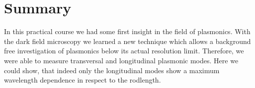 

\chapter{Summary}
\label{chap:sumamry}
In this practical course we had some first insight in the field of plasmonics. With the dark field microscopy we learned a new technique which allows a background free investigation of plasmonics below its actual resolution limit. Therefore, we were able to measure transversal and longitudinal plasmonic modes. Here we could show, that indeed only the longitudinal modes show a maximum wavelength dependence in respect to the rodlength. 

